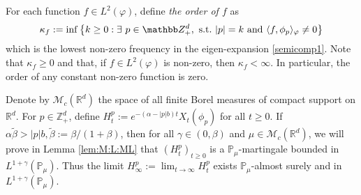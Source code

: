 \documentclass[EJP]{ejpecp} %
\begin{document}
	For each function $f\in L^2(\varphi)$, define \emph{the order of $f$} as
\[
  	\kappa_f
  	:= \inf \left \{k\geq 0: \exists ~ p\in \mathbb Z_+^d , {\rm ~s.t.~} |p|=k {\rm ~and~}  \langle f, \phi_p \rangle_{\varphi}\neq 0\right \}
\]
	which is the lowest non-zero frequency in the eigen-expansion \eqref{semicomp1}.
	Note that $ \kappa_f\geq 0$ and that, if $f\in L^2(\varphi)$ is 
	non-zero, then $\kappa_f<\infty$.
	In particular, the order of any constant non-zero function is zero.

	Denote by $\mathcal M_c(\mathbb R^d)$ the space of all finite Borel measures of compact support on $\mathbb R^d$.
	For $p\in \mathbb{Z}_+^d$, define
\(
  	H_t^p
  	:= e^{-(\alpha-|p|b)t}X_t(\phi_p)
\)
	for all $t\geq 0$.
	If $\alpha \tilde \beta>|p|b, \tilde \beta := \beta/(1+\beta)$, then for all $\gamma\in (0, \beta)$ and $\mu\in \mathcal M_c(\mathbb R^d)$, we will prove in Lemma \ref{lem:M:L:ML} that $(H_t^p)_{t\geq 0}$ is a $\mathbb{P}_{\mu}$-martingale bounded in $L^{1+\gamma}(\mathbb{P}_{\mu})$.
	Thus the limit $H^p_{\infty}:=\lim_{t\rightarrow \infty}H_t^p$ exists $\mathbb{P}_{\mu}$-almost surely and in $L^{1+\gamma}(\mathbb{P}_{\mu})$.
\end{document}
